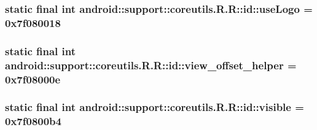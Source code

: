\hypertarget{classandroid_1_1support_1_1coreutils_1_1_r_1_1id_d5f64ce348bfca6d7c4228b41b69b602}{
\subsubsection[{useLogo}]{\setlength{\rightskip}{0pt plus 5cm}static final int android::support::coreutils.R.R::id::useLogo = 0x7f080018}}
\label{classandroid_1_1support_1_1coreutils_1_1_r_1_1id_d5f64ce348bfca6d7c4228b41b69b602}


\hypertarget{classandroid_1_1support_1_1coreutils_1_1_r_1_1id_80ae26c1ea3bda6a34f3c757e03b267c}{
\subsubsection[{view\_\-offset\_\-helper}]{\setlength{\rightskip}{0pt plus 5cm}static final int android::support::coreutils.R.R::id::view\_\-offset\_\-helper = 0x7f08000e}}
\label{classandroid_1_1support_1_1coreutils_1_1_r_1_1id_80ae26c1ea3bda6a34f3c757e03b267c}


\hypertarget{classandroid_1_1support_1_1coreutils_1_1_r_1_1id_36261c63b2d1decfe7c4c1a420f7d25e}{
\subsubsection[{visible}]{\setlength{\rightskip}{0pt plus 5cm}static final int android::support::coreutils.R.R::id::visible = 0x7f0800b4}}
\label{classandroid_1_1support_1_1coreutils_1_1_r_1_1id_36261c63b2d1decfe7c4c1a420f7d25e}


